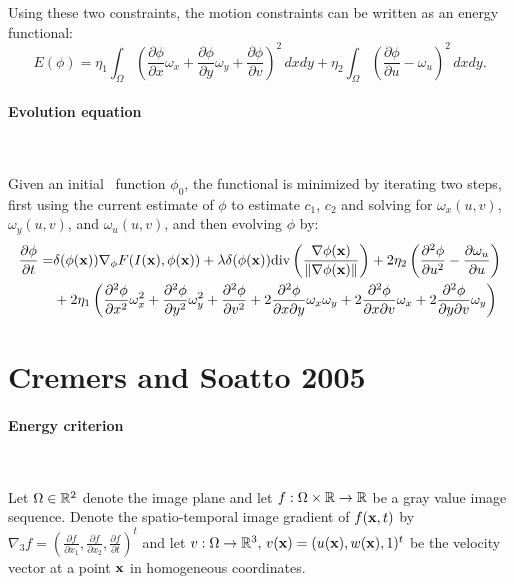 Using these two constraints, the motion constraints can be written as an energy functional:
\begin{equation}
  \label{eq:NRJ_zhang}
  E(\phi) = \eta_1 \int_\Omega \left( \frac{\partial \phi}{\partial x}\omega_x + \frac{\partial \phi}{\partial y}\omega_y + \frac{\partial \phi}{\partial v} \right)^2 \, dxdy + \eta_2 \int_\Omega \left( \frac{\partial \phi}{\partial u} - \omega_u \right)^2 \, dxdy.
\end{equation}

\vspace{0.3cm}
\paragraph{Evolution equation}
~\par \vspace{0.3cm}
Given an initial \ls~function $\phi_0$, the functional  is minimized by iterating two steps, first using the current estimate of $\phi$ to estimate $c_1$, $c_2$ and solving for $\omega_x(u, v)$, $\omega_y(u, v)$, and $\omega_u(u, v)$, and then evolving $\phi$ by:
\begin{eqnarray}
  \label{eq:dphidt_zhang}
  \nonumber \frac{\partial \phi}{\partial t} = &\delta(\phi(\mathbf{x})) \nabla_\phi F(I(\mathbf{x}), \phi(\mathbf{x})) + \lambda \delta(\phi(\mathbf{x})) \text{div}\left(\frac{\nabla \phi(\mathbf{x})}{\|\nabla \phi(\mathbf{x})\|}\right) + 2\eta_2 \left( \dfrac{\partial^2 \phi}{\partial u^2} - \dfrac{\partial \omega_u}{\partial u} \right) \\
 & + 2\eta_1 \left( \dfrac{\partial^2 \phi}{\partial x^2}\omega_x^2 + \dfrac{\partial^2 \phi}{\partial y^2}\omega_y^2 + \dfrac{\partial^2 \phi}{\partial v^2} + 2\dfrac{\partial^2 \phi}{\partial x\partial y}\omega_x\omega_y + 2\dfrac{\partial^2 \phi}{\partial x\partial v}\omega_x + 2\dfrac{\partial^2 \phi}{\partial y\partial v}\omega_y \right)
\end{eqnarray}


\vspace{0.3cm}

\newpage
\section[Cremers and Soatto]{Cremers and Soatto 2005 \cite{Cremers2005, Cremers2003}}
\label{sec:motion-cremers}

\paragraph{Energy criterion}
~\par \vspace{0.3cm}
Let $\Omega \in \mathbb{R}^2$ denote the image plane and let $f: \Omega \times \mathbb{R} \rightarrow \mathbb{R}$ be a gray value image sequence. Denote the spatio-temporal image gradient of $f(\mathbf{x}, t)$ by $\nabla_3 f = \left( \frac{\partial f}{\partial x_1}, \frac{\partial f}{\partial x_2}, \frac{\partial f}{\partial t} \right)^t$ and let $ v : \Omega \rightarrow \mathbb{R}^3, \, v(\mathbf{x}) = ( u(\mathbf{x}), w(\mathbf{x}), 1)^t$ be the velocity vector at a point $\mathbf{x}$ in homogeneous coordinates.

